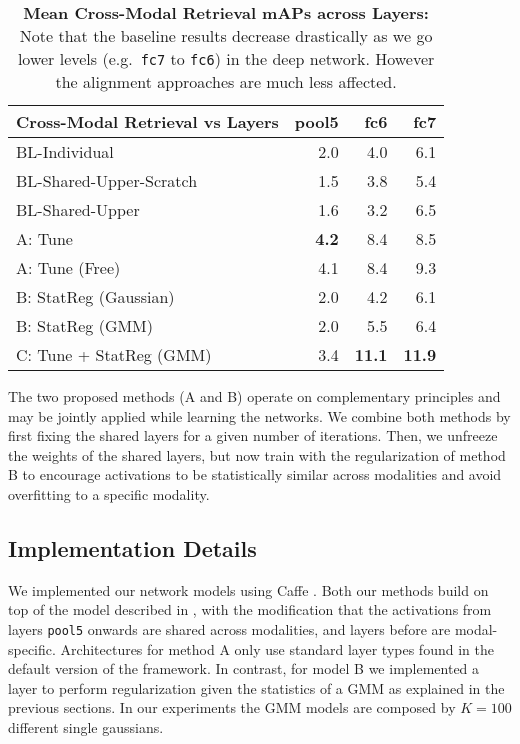\documentclass[10pt,journal,compsoc]{IEEEtran}
\begin{document}
    \begin{table}[t!]
        \begin{center}
        	\setlength{\tabcolsep}{.2em}
        		\bgroup
        		\def\arraystretch{1.3}%
        		        \scriptsize\begin{tabular}{|l|r r r|}
        \hline
        Cross-Modal Retrieval vs Layers & { pool5}  & {fc6}  & { fc7}  \\ 
         \hline{ BL-Individual }  & 2.0 & 4.0 & 6.1 \\ 
         { BL-Shared-Upper-Scratch }& 1.5 & 3.8 & 5.4 \\
         { BL-Shared-Upper }  & 1.6 & 3.2 & 6.5 \\ 
        \hline{ A: Tune }  & \bf{4.2} & 8.4 & 8.5 \\ 
        { A: Tune (Free) }  &  4.1 & 8.4 & 9.3 \\ 
         { B: StatReg (Gaussian)}  & 2.0 & 4.2 & 6.1 \\ 
         { B: StatReg (GMM) }  & 2.0 & 5.5 & 6.4 \\ 
         { C: Tune + StatReg (GMM) }  & 3.4 & \bf{11.1} & \bf{11.9} \\ 
        \hline
        \end{tabular}
        	\egroup
        \end{center}
        \caption{ {\bf Mean Cross-Modal Retrieval mAPs across Layers:} 
        Note that the baseline results decrease drastically as we go lower levels (e.g.\ \texttt{fc7} to \texttt{fc6}) in the deep network. However the alignment approaches are much less affected.}
        \label{table:cmr_across_layers}
    \end{table}


    The two proposed methods (A and B) operate on complementary principles and may be jointly applied while learning the networks. We combine both methods by first fixing the shared layers for a given number of iterations. Then, we unfreeze the weights of the shared layers, but now train with the regularization of method B to encourage activations to be statistically similar across modalities and avoid overfitting to a specific modality. 

    \subsection{Implementation Details}

    We implemented our network models using Caffe \cite{jia2014caffe}. Both  our  methods  build  on  top  of  the  model  described in \cite{krizhevsky2012imagenet}, with the modification that the activations from layers \texttt{pool5} onwards are shared across modalities, and layers before are modal-specific. Architectures for method A only use standard layer types found in the default version of the framework. In contrast, for model B we implemented a layer to perform regularization given the statistics of a GMM as explained in the previous sections. In our experiments the GMM models are composed by $K = 100$ different single gaussians. 
    
\end{document}
